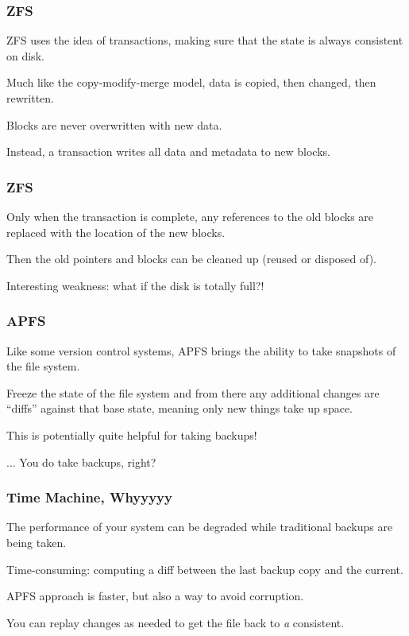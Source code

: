 \begin{frame}
\frametitle{ZFS}

ZFS uses the idea of transactions, making sure that the state is always consistent on disk. 

Much like the copy-modify-merge model, data is copied, then changed, then rewritten. 

Blocks are never overwritten with new data. 

Instead, a transaction writes all data and metadata to new blocks.

\end{frame}


\begin{frame}
\frametitle{ZFS}

 Only when the transaction is complete, any references to the old blocks are replaced with the location of the new blocks.

Then the old pointers and blocks can be cleaned up (reused or disposed of).

Interesting weakness: what if the disk is totally full?!

\end{frame}

\begin{frame}
\frametitle{APFS}

Like some version control systems, APFS brings the ability to take snapshots of the file system.

Freeze the state of the file system and from there any additional changes are ``diffs'' against that base state, meaning only new things take up space.

This is potentially quite helpful for taking backups!


... You do take backups, right?

\end{frame}


\begin{frame}
\frametitle{Time Machine, Whyyyyy}

The performance of your system can be degraded while traditional backups are being taken.

Time-consuming: computing a diff between the last backup copy and the current. 

APFS approach is faster, but also a way to avoid corruption. 

You can replay changes as needed to get the file back to \textit{a} consistent.

\end{frame}


